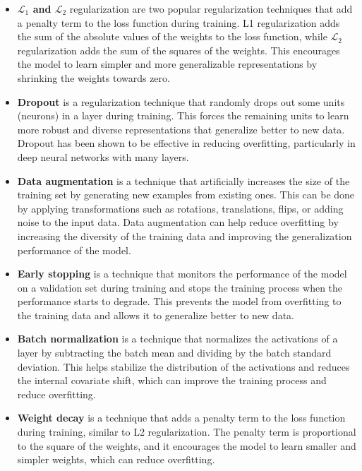 \begin{itemize}
	
	\item \textbf{$\mathcal{L}_1$ and $\mathcal{L}_2$} regularization are two popular regularization techniques that add a penalty term to the loss function during training. L1 regularization adds the sum of the absolute values of the weights to the loss function, while $\mathcal{L}_2$ regularization adds the sum of the squares of the weights. This encourages the model to learn simpler and more generalizable representations by shrinking the weights towards zero.
	
	\item \textbf{Dropout} is a regularization technique that randomly drops out some units (neurons) in a layer during training. This forces the remaining units to learn more robust and diverse representations that generalize better to new data. Dropout has been shown to be effective in reducing overfitting, particularly in deep neural networks with many layers.
	
	\item \textbf{Data augmentation} is a technique that artificially increases the size of the training set by generating new examples from existing ones. This can be done by applying transformations such as rotations, translations, flips, or adding noise to the input data. Data augmentation can help reduce overfitting by increasing the diversity of the training data and improving the generalization performance of the model.
	
	\item \textbf{Early stopping} is a technique that monitors the performance of the model on a validation set during training and stops the training process when the performance starts to degrade. This prevents the model from overfitting to the training data and allows it to generalize better to new data.
	
	\item \textbf{Batch normalization} is a technique that normalizes the activations of a layer by subtracting the batch mean and dividing by the batch standard deviation. This helps stabilize the distribution of the activations and reduces the internal covariate shift, which can improve the training process and reduce overfitting.
	
	\item \textbf{Weight decay} is a technique that adds a penalty term to the loss function during training, similar to L2 regularization. The penalty term is proportional to the square of the weights, and it encourages the model to learn smaller and simpler weights, which can reduce overfitting.
	
\end{itemize}

